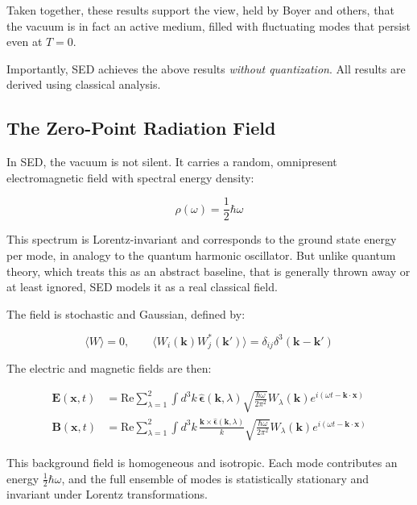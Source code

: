 \documentclass {article}
\renewcommand\vec{\mathbf}
\let\OldHat\hat
\renewcommand{\hat}[1]{\OldHat{\mathbf{#1}}}
\begin{document}
Taken together, these results support the view, held by Boyer and others, that the vacuum is in fact an active medium, filled with fluctuating modes that persist even at \( T = 0 \).

Importantly, SED achieves the above results  \emph{without quantization}. All results are derived using classical analysis.


\subsection{The Zero-Point Radiation Field}

In SED, the vacuum is not silent. It carries a random, omnipresent electromagnetic field with spectral energy density:

\begin{equation}
\rho(\omega) = \frac{1}{2} \hbar \omega
\end{equation}

This spectrum is Lorentz-invariant and corresponds to the ground state energy per mode, in analogy to the quantum harmonic oscillator. But unlike quantum theory, which treats this as an abstract baseline, that is generally thrown away or at least ignored, SED models it as a real classical field.

The field is stochastic and Gaussian, defined by:

\begin{equation}
\langle W \rangle = 0, \qquad 
\langle W_i(\vec{k}) W_j^*(\vec{k}') \rangle = \delta_{ij} \delta^3(\vec{k} - \vec{k}')
\end{equation}

The electric and magnetic fields are then:

\begin{equation}
\begin{aligned}
\vec{E}(\vec{x}, t) &= \text{Re} \sum_{\lambda=1}^2 \int d^3k \, 
\hat{\epsilon}(\vec{k}, \lambda) 
\sqrt{\frac{\hbar \omega}{2\pi^2}} 
W_\lambda(\vec{k}) e^{i(\omega t - \vec{k} \cdot \vec{x})} \\
\vec{B}(\vec{x}, t) &= \text{Re} \sum_{\lambda=1}^2 \int d^3k \, 
\frac{\vec{k} \times \hat{\epsilon}(\vec{k}, \lambda)}{k}
\sqrt{\frac{\hbar \omega}{2\pi^2}} 
W_\lambda(\vec{k}) e^{i(\omega t - \vec{k} \cdot \vec{x})}
\end{aligned}
\end{equation}

This background field is homogeneous and isotropic. Each mode contributes an energy \( \tfrac{1}{2} \hbar \omega \), and the full ensemble of modes is statistically stationary and invariant under Lorentz transformations.
\end{document}
